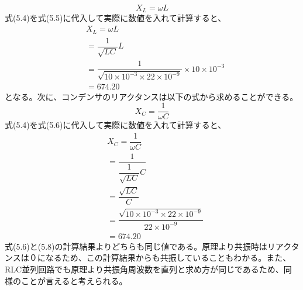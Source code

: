 \documentclass[12pt,a4paper]{jsarticle}
\numberwithin{equation}{section}
\numberwithin{figure}{section}
\numberwithin{table}{section}
\begin{document}
\begin{itemize}
    \begin{equation}
      X_L=\omega L
    \end{equation}
    式(5.4)を式(5.5)に代入して実際に数値を入れて計算すると、
    \begin{equation}
      \begin{split}
        &X_L=\omega L\\
        &=\dfrac{1}{\sqrt{LC}} L\\
        &=\dfrac{1}{\sqrt{10 \times 10^{-3} \times 22 \times 10^{-9}}} \times 10 \times 10^{-3}\\
        &=674.20
      \end{split}
    \end{equation}
    となる。次に、コンデンサのリアクタンスは以下の式から求めることができる。
    \begin{equation}
      X_C=\dfrac{1}{\omega C}
    \end{equation}
    式(5.4)を式(5.6)に代入して実際に数値を入れて計算すると、
    \begin{equation}
      \begin{split}
        &X_C=\dfrac{1}{\omega C}\\
        &=\dfrac{1}{\dfrac{1}{\sqrt{LC}}C}\\
        &=\dfrac{\sqrt{LC}}{C}\\
        &=\dfrac{\sqrt{10 \times 10^{-3} \times 22 \times 10^{-9}}}{22 \times 10^{-9}}\\
        &=674.20
      \end{split}
    \end{equation}
    式(5.6)と(5.8)の計算結果よりどちらも同じ値である。原理より共振時はリアクタンスは０になるため、この計算結果からも共振していることもわかる。また、RLC並列回路でも原理より共振角周波数を直列と求め方が同じであるため、同様のことが言えると考えられる。


\end{itemize}
\end{document}
